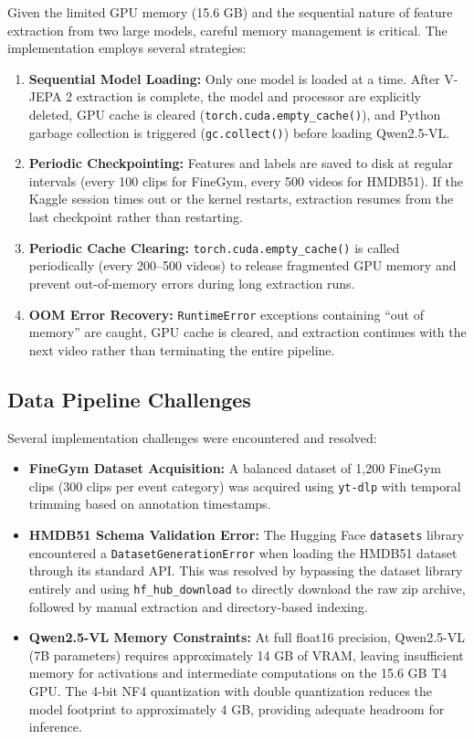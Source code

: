 Given the limited GPU memory (15.6 GB) and the sequential nature of feature extraction from two large models, careful memory management is critical. The implementation employs several strategies:

\begin{enumerate}[leftmargin=*]
    \item \textbf{Sequential Model Loading:} Only one model is loaded at a time. After V-JEPA 2 extraction is complete, the model and processor are explicitly deleted, GPU cache is cleared (\texttt{torch.cuda.empty\_cache()}), and Python garbage collection is triggered (\texttt{gc.collect()}) before loading Qwen2.5-VL.
    \item \textbf{Periodic Checkpointing:} Features and labels are saved to disk at regular intervals (every 100 clips for FineGym, every 500 videos for HMDB51). If the Kaggle session times out or the kernel restarts, extraction resumes from the last checkpoint rather than restarting.
    \item \textbf{Periodic Cache Clearing:} \texttt{torch.cuda.empty\_cache()} is called periodically (every 200--500 videos) to release fragmented GPU memory and prevent out-of-memory errors during long extraction runs.
    \item \textbf{OOM Error Recovery:} \texttt{RuntimeError} exceptions containing ``out of memory'' are caught, GPU cache is cleared, and extraction continues with the next video rather than terminating the entire pipeline.
\end{enumerate}

\subsection{Data Pipeline Challenges}

Several implementation challenges were encountered and resolved:

\begin{itemize}[leftmargin=*]
    \item \textbf{FineGym Dataset Acquisition:} A balanced dataset of 1,200 FineGym clips (300 clips per event category) was acquired using \texttt{yt-dlp} with temporal trimming based on annotation timestamps.
    \item \textbf{HMDB51 Schema Validation Error:} The Hugging Face \texttt{datasets} library encountered a \texttt{DatasetGenerationError} when loading the HMDB51 dataset through its standard API. This was resolved by bypassing the dataset library entirely and using \texttt{hf\_hub\_download} to directly download the raw zip archive, followed by manual extraction and directory-based indexing.
    \item \textbf{Qwen2.5-VL Memory Constraints:} At full float16 precision, Qwen2.5-VL (7B parameters) requires approximately 14 GB of VRAM, leaving insufficient memory for activations and intermediate computations on the 15.6 GB T4 GPU. The 4-bit NF4 quantization with double quantization reduces the model footprint to approximately 4 GB, providing adequate headroom for inference.
\end{itemize}

